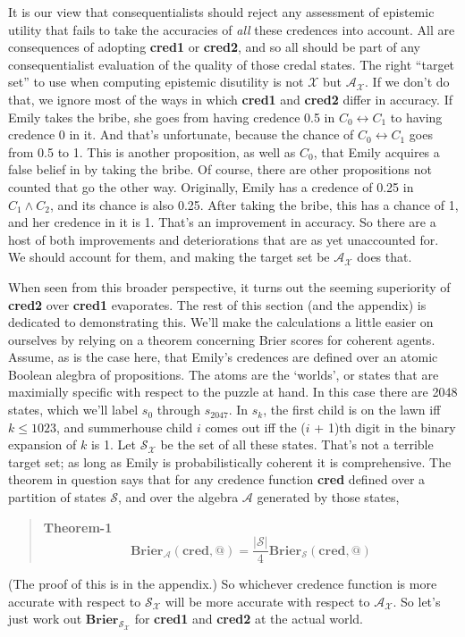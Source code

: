 It is our view that consequentialists should reject any assessment of epistemic utility that fails to take the accuracies of \textit{all} these credences into account. All are consequences of adopting \textbf{cred1} or \textbf{cred2}, and so all should be part of any consequentialist evaluation of the quality of those credal states. The right ``target set'' to use when computing epistemic disutility is not $\mathscr{X}$ but $\mathscr{A}_\mathscr{X}$. If we don't do that, we ignore most of the ways in which \textbf{cred1} and \textbf{cred2} differ in accuracy. If Emily takes the bribe, she goes from having credence 0.5 in $C_0 \leftrightarrow C_1$ to having credence 0 in it. And that's unfortunate, because the chance of $C_0 \leftrightarrow C_1$ goes from 0.5 to 1. This is another proposition, as well as $C_0$, that Emily acquires a false belief in by taking the bribe. Of course, there are other propositions not counted that go the other way. Originally, Emily has a credence of 0.25 in $C_1 \wedge C_2$, and its chance is also 0.25. After taking the bribe, this has a chance of 1, and her credence in it is 1. That's an improvement in accuracy. So there are a host of both improvements and deteriorations that are as yet unaccounted for. We should account for them, and making the target set be $\mathscr{A}_\mathscr{X}$ does that.

When seen from this broader perspective, it turns out the seeming superiority of \textbf{cred2} over \textbf{cred1} evaporates. The rest of this section (and the appendix) is dedicated to demonstrating this. We'll make the calculations a little easier on ourselves by relying on a theorem concerning Brier scores for coherent agents. Assume, as is the case here, that Emily's credences are defined over an atomic Boolean alegbra of propositions. The atoms are the `worlds', or states that are maximially specific with respect to the puzzle at hand. In this case there are 2048 states, which we'll label $s_0$ through $s_{2047}$. In $s_k$, the first child is on the lawn iff $k \leq 1023$, and summerhouse child $i$ comes out iff the ($i$ + 1)th digit in the binary expansion of $k$ is 1. Let $\mathscr{S}_\mathscr{X}$ be the set of all these states. That's not a terrible target set; as long as Emily is probabilistically coherent it is comprehensive. The theorem in question says that for any credence function \textbf{cred} defined over a partition of states $\mathscr{S}$, and over the algebra $\mathscr{A}$ generated by those states,

\begin{quote}
\textbf{Theorem-1}
$$\mathbf{Brier}_{\mathscr{A}}(\mathbf{cred}, @) = \frac{|\mathscr{S}|}{4}\mathbf{Brier}_{\mathscr{S}}(\mathbf{cred}, @)$$
\end{quote}
(The proof of this is in the appendix.) So whichever credence function is more accurate with respect to $\mathscr{S}_{\mathscr{X}}$ will be more accurate with respect to $\mathscr{A}_{\mathscr{X}}$. So let's just work out $\mathbf{Brier}_{\mathscr{S}_{\mathscr{X}}}$ for \textbf{cred1} and \textbf{cred2} at the actual world.

